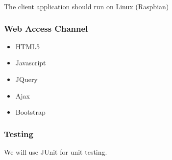 The client application should run on Linux (Raspbian)

\subsubsection{Web Access Channel}
\begin{itemize}
	\item HTML5
	\item Javascript
	\item JQuery
	\item Ajax
	\item Bootstrap
\end{itemize}

\subsubsection{Testing}
We will use JUnit for unit testing.